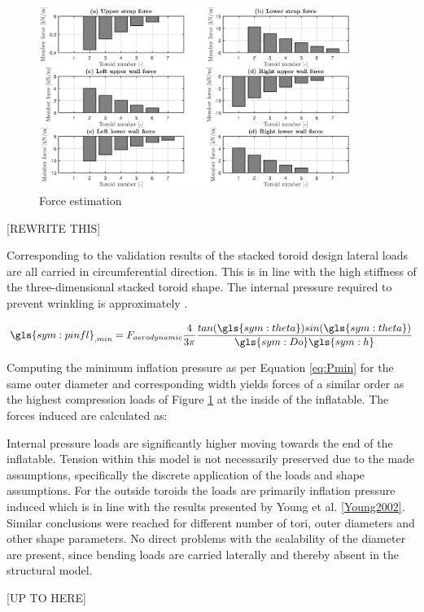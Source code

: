 \begin{figure}[h]
	\centering
	\includegraphics[width=0.9\textwidth]{./Figure/Structure/forces_test.eps}
	\caption{Force estimation }
	\label{fig:forces}
\end{figure}

[REWRITE THIS]

Corresponding to the validation results of the stacked toroid design lateral loads are all carried in circumferential direction. This is in line with the high stiffness of the three-dimensional stacked toroid shape. %
The internal pressure required to prevent wrinkling is approximately \cite{Brown2009}. 

\begin{equation}
\label{eq:Pmin}
\gls{sym:pinfl}_{,min} = F_{aerodynamic} \frac{4}{3 \pi} \frac{tan(\gls{sym:theta})sin(\gls{sym:theta}) }{\gls{sym:Do}\gls{sym:h}}
\end{equation}

Computing the minimum inflation pressure as per Equation \ref{eq:Pmin} for the same outer diameter and corresponding width yields forces of a similar order as the highest compression loads of Figure \ref{fig:forces} at the inside of the inflatable. The forces induced are calculated as:


 Internal pressure loads are significantly higher moving towards the end of the inflatable. Tension within this model is not necessarily preserved due to the made assumptions, specifically the discrete application of the loads and shape assumptions. For the outside toroids the loads are primarily inflation pressure induced which is in line with the results presented by Young et al. \ref{Young2002}. Similar conclusions were reached for different number of tori, outer diameters and other shape parameters. No direct problems with the scalability of the diameter are present, since bending loads are carried laterally and thereby absent in the structural model. 

[UP TO HERE]

